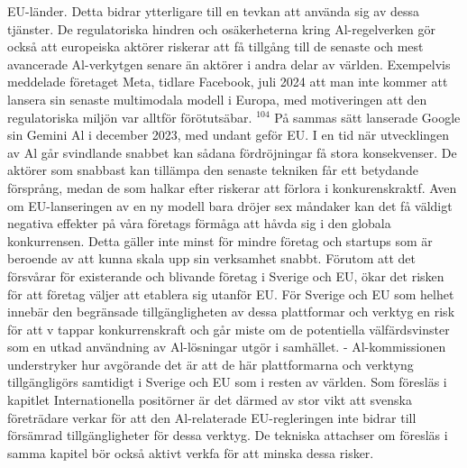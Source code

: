 {{{{{{{{{{{{{{{EU-länder. Detta bidrar ytterligare till en tevkan att använda sig av dessa tjänster.
De regulatoriska hindren och osäkerheterna kring Al-regelverken gör också att europeiska aktörer riskerar att få tillgång till de senaste och mest avancerade Al-verkytgen senare än aktörer i andra delar av världen. Exempelvis meddelade företaget Meta, tidlare Facebook, juli 2024 att man inte kommer att lansera sin senaste multimodala modell i Europa, med motiveringen att den regulatoriska miljön var alltför förötutsäbar. \({ }^{104}\) På sammas sätt lanserade Google sin Gemini \(\mathrm{Al}\) i december 2023, med undant geför EU.
I en tid när utvecklingen av Al går svindlande snabbet kan sådana fördröjningar få stora konsekvenser. De aktörer som snabbast kan tillämpa den senaste tekniken får ett betydande försprång, medan de som halkar efter riskerar att förlora i konkurenskraktf. Aven om EU-lanseringen av en ny modell bara dröjer sex måndaker kan det få väldigt negativa effekter på våra
företags förmåga att håvda sig i den globala konkurrensen. Detta gäller inte minst för mindre företag och startups som är beroende av att kunna skala upp sin verksamhet snabbt. Förutom att det försvårar för existerande och blivande företag i Sverige och EU, ökar det risken för att företag väljer att etablera sig utanför EU. För Sverige och EU som helhet innebär den begränsade tillgängligheten av dessa plattformar och verktyg en risk för att v tappar konkurrenskraft och går miste om de potentiella välfärdsvinster som en utkad användning av Al-lösningar utgör i samhället.
- Al-kommissionen understryker hur avgörande det är att de här plattformarna och verktyng tillgängligörs samtidigt i Sverige och EU som i resten av världen. Som föresläs i kapitlet Internationella positörner är det därmed av stor vikt att svenska företrädare verkar för att den Al-relaterade EU-regleringen inte bidrar till försämrad tillgängligheter för dessa verktyg. De tekniska attachser om föresläs i samma kapitel bör också aktivt verkfa för att minska dessa risker.
}}}}}}}}}}}}}}}
